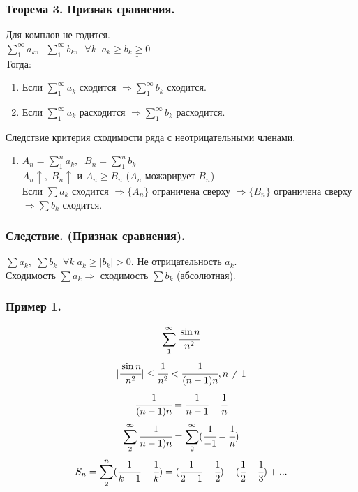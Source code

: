 \documentclass[12pt, a4paper]{article}
\begin{document}
\begin{centering}
\subsubsection{Теорема 3. Признак сравнения.}
Для комплов не годится.\\
$\sum^{\infty}_{1} a_k,\;\; \sum^{\infty}_{1} b_k,\;\; \forall k\;\; a_k \geq \underline{b_k \geq 0}$\\
Тогда:
\begin{enumerate}
    \item Если $\sum^{\infty}_{1} a_k$ сходится $\Rightarrow \sum^{\infty}_{1} b_k$ сходится.
    \item Если $\sum^{\infty}_{1} a_k$ расходится $\Rightarrow \sum^{\infty}_{1} b_k$ расходится.
\end{enumerate}
\begin{tcolorbox}[title=Доказательство]
Следствие критерия сходимости ряда с неотрицательными членами.\\
\begin{enumerate}
    \item $A_n = \sum^{n}_{1} a_k,\;\; B_n = \sum^{n}_{1} b_k $\\
    $A_n \uparrow,\; B_n \uparrow$ и $A_n \geq B_n$ ($A_n$ можарирует $B_n$)\\
    Если $\sum a_k$ сходится $\Rightarrow \{A_n\}$ ограничена сверху $\Rightarrow \{B_n\}$ ограничена сверху $\Rightarrow \sum b_k$ сходится.
\end{enumerate}
\end{tcolorbox}

\subsubsection{Следствие. (Признак сравнения).}
$\sum a_k,\; \sum b_k \;\; \forall k\; a_k \geq |b_k| > 0$. Не отрицательность $a_k$.\\
Сходимость $\sum a_k \Rightarrow$ сходимость $\sum b_k$ (абсолютная).
\subsubsection*{Пример 1.}
\[\sum^{\infty}_{1} \cfrac{\sin n}{n^2}\]
\[|\cfrac{\sin n}{n^2}| \leq \cfrac{1}{n^2} < \cfrac{1}{(n-1)n}, n \not= 1\]
\[ \cfrac{1}{(n-1)n} = \cfrac{1}{n-1} - \cfrac{1}{n} \]
\[ \sum^{\infty}_{2} \cfrac{1}{n-1)n} = \sum^{\infty}_{2}( \cfrac{1}{-1} - \cfrac{1}{n}) \]
\[ S_n = \sum^{n}_{2} (\cfrac{1}{k-1} - \cfrac{1}{k}) = (\cfrac{1}{2-1} - \cfrac{1}{2}) + (\cfrac{1}{2} - \cfrac{1}{3}) + ... \]


\end{centering}
\end{document}
